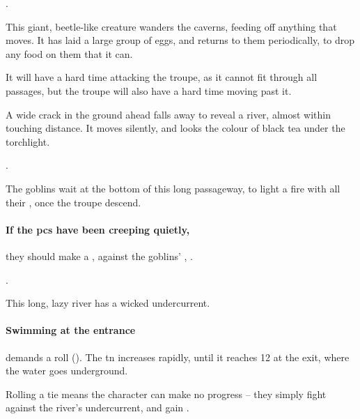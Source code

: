 \begin{multicols}{2}
.


This giant, beetle-like creature%
wanders the caverns, feeding off anything that moves.
It has laid a large group of eggs, and returns to them periodically, to drop any food on them that it can.

It will have a hard time attacking the troupe, as it cannot fit through all passages, but the troupe will also have a hard time moving past it.

\umberhulk

\begin{boxtext}
  A wide crack in the ground ahead falls away to reveal a river, almost within touching distance.
  It moves silently, and looks the colour of black tea under the torchlight.
\end{boxtext}

.


The goblins wait at the bottom of this long passageway, to light a fire with all their \fireFuel, once the troupe descend.




\paragraph{If the \glspl{pc} have been creeping quietly,}
they should make a , against the goblins' , \tn.

.


This long, lazy river has a wicked undercurrent.

\paragraph{Swimming at the entrance}
demands a  roll (\tn[5]).
The \gls{tn} increases rapidly, until it reaches 12 at the exit, where the water goes underground.

Rolling a tie means the character can make no progress -- they simply fight against the river's undercurrent, and gain .


\end{multicols}
